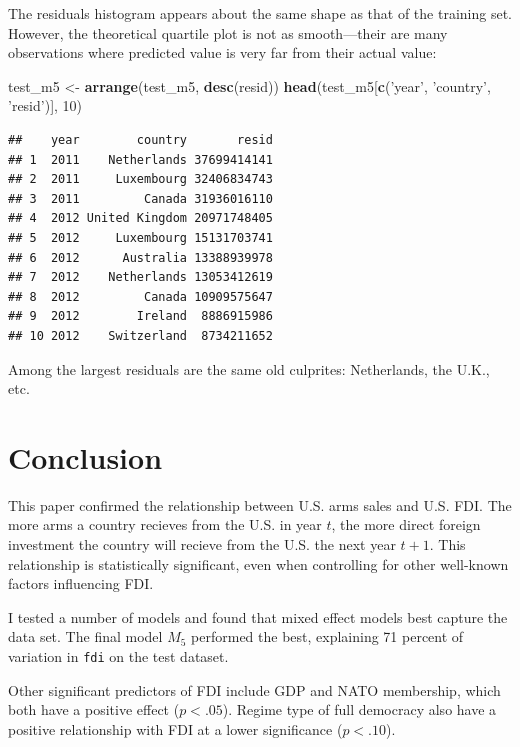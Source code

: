 \documentclass[11pt,]{article}
\newenvironment{Shaded}{\begin{snugshade}}{\end{snugshade}}
\newcommand{\DecValTok}[1]{\textcolor[rgb]{0.00,0.00,0.81}{#1}}
\newcommand{\KeywordTok}[1]{\textcolor[rgb]{0.13,0.29,0.53}{\textbf{#1}}}
\newcommand{\NormalTok}[1]{#1}
\newcommand{\StringTok}[1]{\textcolor[rgb]{0.31,0.60,0.02}{#1}}
\begin{document}
The residuals histogram appears about the same shape as that of the
training set. However, the theoretical quartile plot is not as
smooth---their are many observations where predicted value is very far
from their actual value:

\begin{Shaded}
\begin{Highlighting}[]
\NormalTok{test_m5 <-}\StringTok{ }\KeywordTok{arrange}\NormalTok{(test_m5, }\KeywordTok{desc}\NormalTok{(resid))}
\KeywordTok{head}\NormalTok{(test_m5[}\KeywordTok{c}\NormalTok{(}\StringTok{'year'}\NormalTok{, }\StringTok{'country'}\NormalTok{, }\StringTok{'resid'}\NormalTok{)], }\DecValTok{10}\NormalTok{)}
\end{Highlighting}
\end{Shaded}

\begin{verbatim}
##    year        country       resid
## 1  2011    Netherlands 37699414141
## 2  2011     Luxembourg 32406834743
## 3  2011         Canada 31936016110
## 4  2012 United Kingdom 20971748405
## 5  2012     Luxembourg 15131703741
## 6  2012      Australia 13388939978
## 7  2012    Netherlands 13053412619
## 8  2012         Canada 10909575647
## 9  2012        Ireland  8886915986
## 10 2012    Switzerland  8734211652
\end{verbatim}

Among the largest residuals are the same old culprites: Netherlands, the
U.K., etc.

\hypertarget{conclusion}{%
\section{Conclusion}\label{conclusion}}

This paper confirmed the relationship between U.S. arms sales and U.S.
FDI. The more arms a country recieves from the U.S. in year \(t\), the
more direct foreign investment the country will recieve from the U.S.
the next year \(t+1\). This relationship is statistically significant,
even when controlling for other well-known factors influencing FDI.

I tested a number of models and found that mixed effect models best
capture the data set. The final model \(M_5\) performed the best,
explaining 71 percent of variation in \texttt{fdi} on the test dataset.

Other significant predictors of FDI include GDP and NATO membership,
which both have a positive effect (\(p < .05\)). Regime type of full
democracy also have a positive relationship with FDI at a lower
significance (\(p < .10\)).
\end{document}
